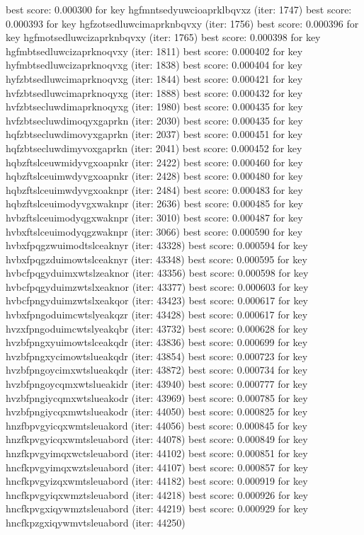\documentclass[]{article}
\begin{document}
best score: 0.000300 for key hgfmntsedyuwcioaprklbqvxz (iter: 1747)
best score: 0.000393 for key hgfzotsedluwcimaprknbqvxy (iter: 1756)
best score: 0.000396 for key hgfmotsedluwcizaprknbqvxy (iter: 1765)
best score: 0.000398 for key hgfmbtsedluwcizaprknoqvxy (iter: 1811)
best score: 0.000402 for key hyfmbtsedluwcizaprknoqvxg (iter: 1838)
best score: 0.000404 for key hyfzbtsedluwcimaprknoqvxg (iter: 1844)
best score: 0.000421 for key hvfzbtsedluwcimaprknoqyxg (iter: 1888)
best score: 0.000432 for key hvfzbtsecluwdimaprknoqyxg (iter: 1980)
best score: 0.000435 for key hvfzbtsecluwdimoqyxgaprkn (iter: 2030)
best score: 0.000435 for key hqfzbtsecluwdimovyxgaprkn (iter: 2037)
best score: 0.000451 for key hqfzbtsecluwdimyvoxgaprkn (iter: 2041)
best score: 0.000452 for key hqbzftslceuwmidyvgxoapnkr (iter: 2422)
best score: 0.000460 for key hqbzftslceuimwdyvgxoapnkr (iter: 2428)
best score: 0.000480 for key hqbzftslceuimwdyvgxoaknpr (iter: 2484)
best score: 0.000483 for key hqbzftslceuimodyvgxwaknpr (iter: 2636)
best score: 0.000485 for key hvbzftslceuimodyqgxwaknpr (iter: 3010)
best score: 0.000487 for key hvbxftslceuimodyqgzwaknpr (iter: 3066)
best score: 0.000590 for key hvbxfpqgzwuimodtslceaknyr (iter: 43328)
best score: 0.000594 for key hvbxfpqgzduimowtslceaknyr (iter: 43348)
best score: 0.000595 for key hvbcfpqgyduimxwtslzeaknor (iter: 43356)
best score: 0.000598 for key hvbcfpqgyduimzwtslxeaknor (iter: 43377)
best score: 0.000603 for key hvbcfpngyduimzwtslxeakqor (iter: 43423)
best score: 0.000617 for key hvbxfpngoduimcwtslyeakqzr (iter: 43428)
best score: 0.000617 for key hvzxfpngoduimcwtslyeakqbr (iter: 43732)
best score: 0.000628 for key hvzbfpngxyuimowtslceakqdr (iter: 43836)
best score: 0.000699 for key hvzbfpngxycimowtslueakqdr (iter: 43854)
best score: 0.000723 for key hvzbfpngoycimxwtslueakqdr (iter: 43872)
best score: 0.000734 for key hvzbfpngoycqmxwtslueakidr (iter: 43940)
best score: 0.000777 for key hvzbfpngiycqmxwtslueakodr (iter: 43969)
best score: 0.000785 for key hvzbfpngiycqxmwtslueakodr (iter: 44050)
best score: 0.000825 for key hnzfbpvgyicqxwmtsleuakord (iter: 44056)
best score: 0.000845 for key hnzfkpvgyicqxwmtsleuabord (iter: 44078)
best score: 0.000849 for key hnzfkpvgyimqxwctsleuabord (iter: 44102)
best score: 0.000851 for key hncfkpvgyimqxwztsleuabord (iter: 44107)
best score: 0.000857 for key hncfkpvgyizqxwmtsleuabord (iter: 44182)
best score: 0.000919 for key hncfkpvgyiqxwmztsleuabord (iter: 44218)
best score: 0.000926 for key hncfkpvgxiqywmztsleuabord (iter: 44219)
best score: 0.000929 for key hncfkpzgxiqywmvtsleuabord (iter: 44250)
\end{document}
